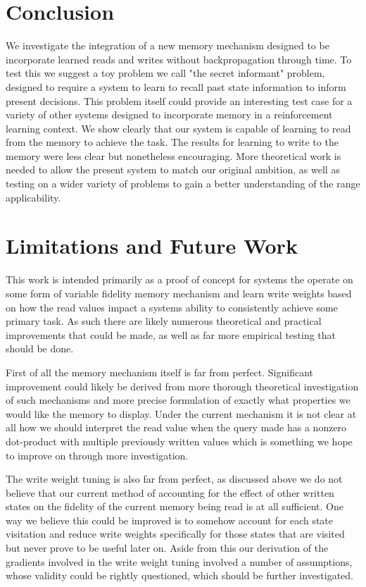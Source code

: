 \documentclass{article}
\begin{document}
\section*{Conclusion}
We investigate the integration of a new memory mechanism designed to be incorporate learned reads and writes without backpropagation through time. To test this we suggest a toy problem we call "the secret informant" problem, designed to require a system to learn to recall past state information to inform present decisions. This problem itself could provide an interesting test case for a variety of other systems designed to incorporate memory in a reinforcement learning context. We show clearly that our system is capable of learning to read from the memory to achieve the task. The results for learning to write to the memory were less clear but nonetheless encouraging. More theoretical work is needed to allow the present system to match our original ambition, as well as testing on a wider variety of problems to gain a better understanding of the range applicability.

\section*{Limitations and Future Work}
This work is intended primarily as a proof of concept for systems the operate on some form of variable fidelity memory mechanism and learn write weights based on how the read values impact a systems ability to consistently achieve some primary task. As such there are likely numerous theoretical and practical improvements that could be made, as well as far more empirical testing that should be done. 

First of all the memory mechanism itself is far from perfect. Significant improvement could likely be derived from more thorough theoretical investigation of such mechanisms and more precise formulation of exactly what properties we would like the memory to display. Under the current mechanism it is not clear at all how we should interpret the read value when the query made has a nonzero dot-product with multiple previously written values which is something we hope to improve on through more investigation.

The write weight tuning is also far from perfect, as discussed above we do not believe that our current method of accounting for the effect of other written states on the fidelity of the current memory being read is at all sufficient. One way we believe this could be improved is to somehow account for each state visitation and reduce write weights specifically for those states that are visited but never prove to be useful later on. Aside from this our derivation of the gradients involved in the write weight tuning involved a number of assumptions, whose validity could be rightly questioned, which should be further investigated.
\end{document}
